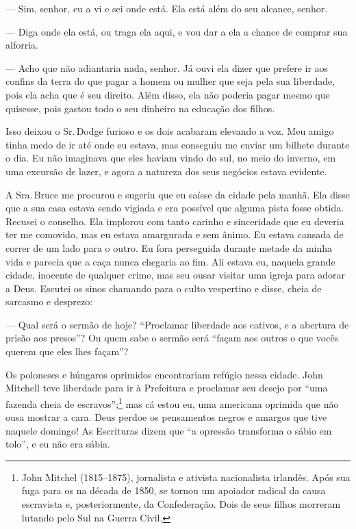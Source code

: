 --- Sim, senhor, eu a vi e sei onde
está. Ela está além do seu alcance, senhor.

--- Diga onde ela está, ou traga ela
aqui, e vou dar a ela a chance de comprar sua alforria.

--- Acho que não adiantaria nada,
senhor. Já ouvi ela dizer que prefere ir aos confins da terra do que
pagar a homem ou mulher que seja pela sua liberdade, pois ela acha que é
seu direito. Além disso, ela não poderia pagar mesmo que quisesse, pois
gastou todo o seu dinheiro na educação dos filhos.

Isso deixou o Sr.\,Dodge furioso e os
dois acabaram elevando a voz. Meu amigo tinha medo de ir até onde eu
estava, mas conseguiu me enviar um bilhete durante o dia. Eu não
imaginava que eles haviam vindo do sul, no meio do inverno, em uma
excursão de lazer, e agora a natureza dos seus negócios estava evidente.

A Sra.\,Bruce me procurou e sugeriu que
eu saísse da cidade pela manhã. Ela disse que a sua casa estava sendo
vigiada e era possível que alguma pista fosse obtida. Recusei o
conselho. Ela implorou com tanto carinho e sinceridade que eu deveria
ter me comovido, mas eu estava amargurada e sem ânimo. Eu estava cansada
de correr de um lado para o outro. Eu fora perseguida durante metade da
minha vida e parecia que a caça nunca chegaria ao fim. Ali estava eu,
naquela grande cidade, inocente de qualquer crime, mas seu ousar visitar
uma igreja para adorar a Deus. Escutei os sinos chamando para o culto
vespertino e disse, cheia de sarcasmo e desprezo:

--- Qual será o sermão de hoje? ``Proclamar liberdade aos cativos, e a
abertura de prisão aos presos''? Ou quem sabe o sermão será ``façam aos
outros o que vocês querem que eles lhes façam''?

Os poloneses e húngaros oprimidos encontrariam refúgio nessa cidade.
John Mitchell teve liberdade para ir à Prefeitura e proclamar seu desejo
por ``uma fazenda cheia de escravos'';\footnote{John Mitchel (1815--1875),
  jornalista e ativista nacionalista irlandês. Após sua fuga para os 
  na década de 1850, se tornou um apoiador radical da causa escravista
  e, posteriormente, da Confederação. Dois de seus filhos morreram
  lutando pelo Sul na Guerra Civil.} mas cá estou eu, uma americana
oprimida que não ousa mostrar a cara. Deus perdoe os pensamentos negros
e amargos que tive naquele domingo! As Escrituras dizem que ``a opressão
transforma o sábio em tolo'', e eu não era sábia.

